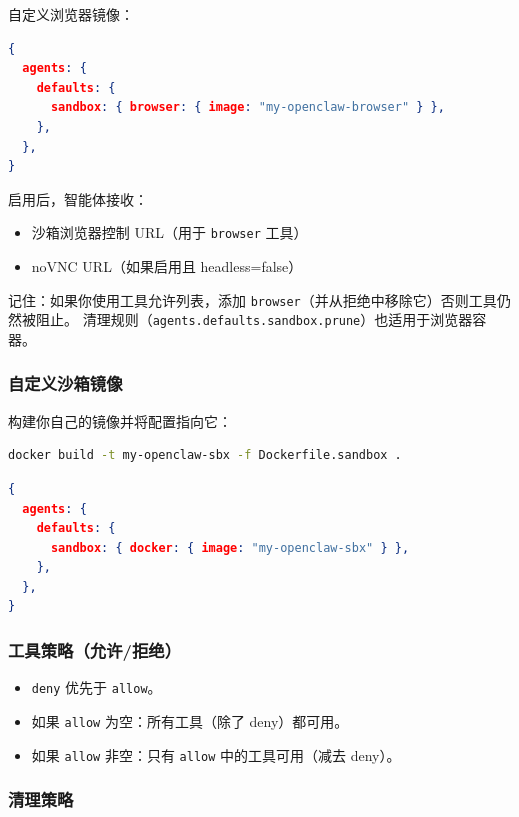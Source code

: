 自定义浏览器镜像：

\begin{lstlisting}[language=json]
{
  agents: {
    defaults: {
      sandbox: { browser: { image: "my-openclaw-browser" } },
    },
  },
}
\end{lstlisting}


启用后，智能体接收：

\begin{itemize}
  \item 沙箱浏览器控制 URL（用于 \texttt{browser} 工具）
  \item noVNC URL（如果启用且 headless=false）
\end{itemize}


记住：如果你使用工具允许列表，添加 \texttt{browser}（并从拒绝中移除它）否则工具仍然被阻止。
清理规则（\texttt{agents.defaults.sandbox.prune}）也适用于浏览器容器。

\subsubsection{自定义沙箱镜像}


构建你自己的镜像并将配置指向它：

\begin{lstlisting}[language=bash]
docker build -t my-openclaw-sbx -f Dockerfile.sandbox .
\end{lstlisting}


\begin{lstlisting}[language=json]
{
  agents: {
    defaults: {
      sandbox: { docker: { image: "my-openclaw-sbx" } },
    },
  },
}
\end{lstlisting}


\subsubsection{工具策略（允许/拒绝）}


\begin{itemize}
  \item \texttt{deny} 优先于 \texttt{allow}。
  \item 如果 \texttt{allow} 为空：所有工具（除了 deny）都可用。
  \item 如果 \texttt{allow} 非空：只有 \texttt{allow} 中的工具可用（减去 deny）。
\end{itemize}


\subsubsection{清理策略}


